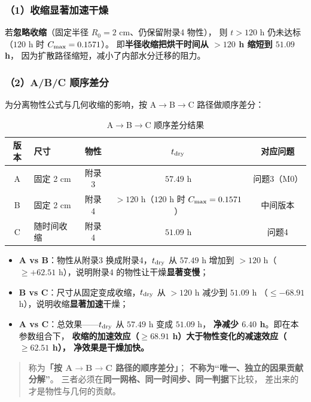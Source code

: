 \subsubsection*{（1）收缩显著加速干燥}

若\textbf{忽略收缩}（固定半径 $R_0=2$ cm、仍保留附录4 物性），
则 $t>120$ h 仍未达标（$120$ h 时 $C_{\max}=0.1571$）。
即\textbf{半径收缩把烘干时间从 $>120$ h 缩短到 $51.09$ h}，
因为扩散路径缩短，减小了内部水分迁移的阻力。

\subsubsection*{（2）A/B/C 顺序差分}
\label{sec:abc}

为分离物性公式与几何收缩的影响，按 A$\to$B$\to$C 路径做顺序差分：

\begin{table}[H]
  \centering
  \caption{A$\to$B$\to$C 顺序差分结果}
  \label{tab:abc}
  \footnotesize
  \begin{tabular}{@{}clccc@{}}
    \toprule
    版本 & 尺寸 & 物性 & $t_{\mathrm{dry}}$ & 对应问题 \\
    \midrule
    A & 固定 2 cm & 附录3 & $57.49$ h & 问题3（M0） \\
    B & 固定 2 cm & 附录4 & $>120$ h（$120$ h 时 $C_{\max}=0.1571$） & 中间版本 \\
    C & 随时间收缩 & 附录4 & $\mathbf{51.09}$ h & 问题4 \\
    \bottomrule
  \end{tabular}
\end{table}

\begin{itemize}[leftmargin=1.6em, itemsep=2pt]
  \item \textbf{A vs B}：物性从附录3 换成附录4，$t_{\mathrm{dry}}$ 从 $57.49$ h 增加到
        $>120$ h（$\ge+62.51$ h），说明附录4 的物性让干燥\textbf{显著变慢}；
  \item \textbf{B vs C}：尺寸从固定变成收缩，$t_{\mathrm{dry}}$ 从 $>120$ h 减少到 $51.09$ h
        （$\le-68.91$ h），说明收缩\textbf{显著加速}干燥；
  \item \textbf{A vs C}：总效果——$t_{\mathrm{dry}}$ 从 $57.49$ h 变成 $51.09$ h，
        \textbf{净减少 $6.40$ h}。即在本参数组合下，
        \textbf{收缩的加速效应（$\ge68.91$ h）大于物性变化的减速效应（$\ge62.51$ h），
        净效果是干燥加快。}
\end{itemize}

\begin{quote}
  称为\textbf{「按 A$\to$B$\to$C 路径的顺序差分」}；
  \textbf{不称为``唯一、独立的因果贡献分解''}。
  三者必须在\textbf{同一网格、同一时间步、同一判据}下比较，
  差出来的才是物性与几何的贡献。
\end{quote}

